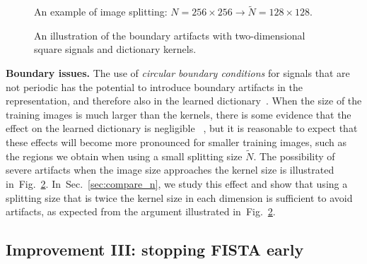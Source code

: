 \documentclass[final]{siamart1116}
\newcommand{\fig}[1]{Fig.~\ref{fig:#1}}
\newcommand{\sctn}[1]{Sec.~\ref{sec:#1}}
\begin{document}
\begin{figure}[t]
\centering

\caption{An example of image splitting: $N=256\times256 \to \tilde{N}=128\times128$. }
\label{fig:regionsample}
\end{figure}


\begin{figure}[t]
    \centering
{}
    \hfill
{}
    \hfill
{}
    \caption{An illustration of the boundary artifacts
with two-dimensional square signals and dictionary kernels.
}
 \label{fig:boundary}
\end{figure}

\textbf{Boundary issues.} The use of \emph{circular boundary conditions} for signals that are not periodic has the potential to introduce boundary artifacts in the representation, and therefore also in the learned dictionary~\cite{zeiler-2010-deconvolutional}. When the size of the training images is much larger than the kernels, there is some evidence that the effect on the learned dictionary is negligible ~\cite{bristow-2013-fast}, but it is reasonable to expect that these effects will become more pronounced for smaller training images, such as the regions we obtain when using a small splitting size $\tilde{N}$. The possibility of severe artifacts when the image size approaches the kernel size is illustrated in~\fig{boundary}.
In~\sctn{compare_n}, we study this effect and show that using a splitting size that is twice the kernel size
in each dimension
is sufficient to avoid artifacts, as expected from the argument illustrated in~\fig{boundary}.



\subsection{Improvement III: stopping FISTA early}
\label{para:inexact}
\end{document}
